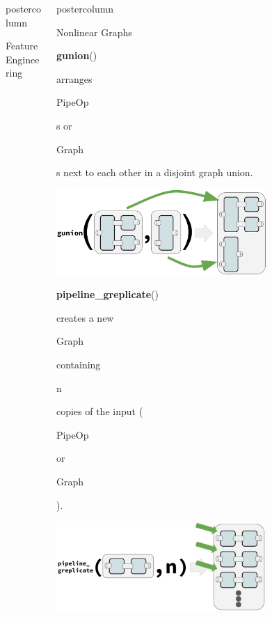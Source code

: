 \documentclass{beamer}
\newlength{\columnheight} %
\newcommand{\codeinline}[1]{\begin{codeboxinline}#1\end{codeboxinline}}
\begin{document}
\begin{frame}[fragile]{}
\begin{columns}
\begin{column}{.245\textwidth}
\begin{beamercolorbox}[center]{postercolumn}
\begin{minipage}{.98\textwidth}
{\begin{myblock}{Feature Engineering}
            \end{myblock}
            \vspace{-1.0em}
            \vfill}
        \end{minipage}
      \end{beamercolorbox}
    \end{column}
    \begin{column}{.245\textwidth}
      \begin{beamercolorbox}[center]{postercolumn}
        \begin{minipage}{.98\textwidth}
          \parbox[t][\columnheight]{\textwidth}{
            \begin{myblock}{Nonlinear Graphs}
              \codeinline{\textbf{gunion}()} arranges \codeinline{PipeOp}s or \codeinline{Graph}s next to each other in a disjoint graph union.
              \\
              \begin{center}
                \includegraphics[width=0.7\textwidth]{img/gunion.pdf}
              \end{center}
              \vspace{0.3em}
              \codeinline{\textbf{pipeline\_greplicate}()} creates a new \codeinline{Graph} containing \codeinline{n} copies of the input (\codeinline{PipeOp} or \codeinline{Graph}).
              \\
              \begin{center}
                \includegraphics[width=0.7\textwidth]{img/greplicate.pdf}

\end{center}
\end{myblock}}
\end{minipage}
\end{beamercolorbox}
\end{column}
\end{columns}
\end{frame}
\end{document}

